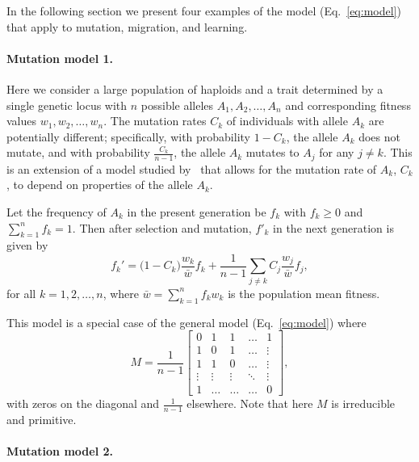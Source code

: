 \documentclass[9pt, a4paper, twocolumn]{extarticle}
\begin{document}
In the following section we present four examples of the model (Eq.~\ref{eq:model}) that apply to mutation, migration, and learning.

\paragraph*{Mutation model 1.}\label{sec:mut_model_1}

Here we consider a large population of haploids and a trait determined by a single genetic locus with $n$ possible alleles $A_1, A_2, \ldots, A_n$ and corresponding fitness values $w_1, w_2, \ldots, w_n$.
The mutation rates $C_k$ of individuals with allele $A_k$ are potentially different;
specifically, with probability $1-C_k$, the allele $A_k$ does not mutate, and with probability $\frac{C_k}{n-1}$, the allele $A_k$ mutates to $A_j$ for any $j \ne k$.
This is an extension of a model studied by~\citet{Altenberg2017} that allows for the mutation rate of $A_k$, $C_k$, to depend on properties of the allele $A_k$.

Let the frequency of $A_k$ in the present generation be $f_k$ with $f_k \ge 0$ and $\sum_{k=1}^{n}{f_k}=1$.
Then after selection and mutation, $f'_k$ in the next generation is given by
\begin{equation}
f_k' = \big(1 - C_k\big) \frac{w_k}{\bar{w}} f_k + \frac{1}{n-1} \sum_{j \ne k}{C_j \frac{w_j}{\bar{w}} f_j},
\label{eq:mutation_model_1}
\end{equation}
for all $k=1, 2, \ldots, n$, where $\bar{w} = \sum_{k=1}^{n}{f_k w_k}$ is the population mean fitness.

This model is a special case of the general model (Eq.~\ref{eq:model}) where
\begin{equation} 
{M} = \frac{1}{n-1} \begin{bmatrix}
0 & 1 & 1 & \ldots & 1 \\
1 & 0 & 1 & \ldots & \vdots \\
1 & 1 & 0 & \ldots & \vdots \\
\vdots & \vdots & \vdots & \ddots & \vdots \\
1 & \ldots & \ldots & \ldots & 0
\end{bmatrix},
\end{equation}
with zeros on the diagonal and $\frac{1}{n-1}$ elsewhere.
Note that here ${M}$ is irreducible and primitive.

\paragraph*{Mutation model 2.}\label{sec:mut_model_2}
\end{document}
